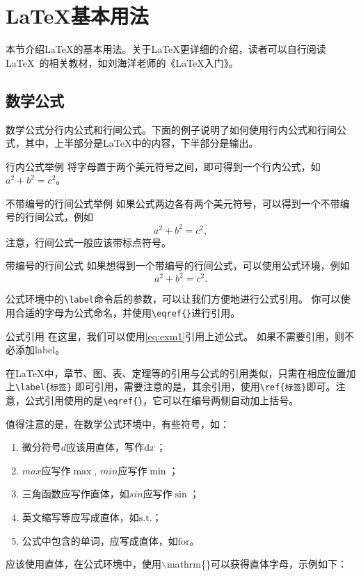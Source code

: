 \section{\LaTeX 基本用法}
本节介绍\LaTeX 的基本用法。关于\LaTeX 更详细的介绍，读者可以自行阅读\LaTeX~的相关教材，如刘海洋老师的《LaTeX入门》\cite{Liu2013}。

\subsection{数学公式}
数学公式分行内公式和行间公式。下面的例子说明了如何使用行内公式和行间公式，其中，上半部分是LaTeX中的内容，下半部分是输出。

\begin{myexample}{行内公式举例}
将字母置于两个美元符号之间，即可得到一个行内公式，如$a^2+b^2=c^2$。
\end{myexample}


\begin{myexample}{不带编号的行间公式举例}
如果公式两边各有两个美元符号，可以得到一个不带编号的行间公式，例如
$$a^2+b^2=c^2,$$
注意，行间公式一般应该带标点符号。
\end{myexample}

\begin{myexample}{带编号的行间公式}
如果想得到一个带编号的行间公式，可以使用公式环境，例如
\begin{equation}\label{eq:exm1}
    a^2+b^2=c^2.
\end{equation}

\end{myexample}

公式环境中的\verb|\label|命令后的参数，可以让我们方便地进行公式引用。
你可以使用合适的字母为公式命名，并使用\verb|\eqref{}|进行引用。
\begin{myexample}{公式引用}
在这里，我们可以使用\eqref{eq:exm1}引用上述公式。
如果不需要引用，则不必添加label。
\end{myexample}

在LaTeX中，章节、图、表、定理等的引用与公式的引用类似，只需在相应位置加上\verb|\label{标签}| 即可引用，需要注意的是，其余引用，使用\verb|\ref{标签}|即可。注意，公式引用使用的是\verb|\eqref{}|，它可以在编号两侧自动加上括号。


\noindent 值得注意的是，在数学公式环境中，有些符号，如：
\begin{enumerate}
	\item 微分符号$d$应该用直体，写作$\mathrm{d} x$；
	\item $max$应写作$\max$, $min$应写作$\min$；
	\item 三角函数应写作直体，如$sin$应写作$\sin$；
	\item 英文缩写等应写成直体，如$\mathrm{s.t.}$；
    \item 公式中包含的单词，应写成直体，如$\mathrm{for}$。
\end{enumerate}
应该使用直体，在公式环境中，使用{\ttfamily $\backslash$mathrm\{\}}可以获得直体字母，示例如下：

